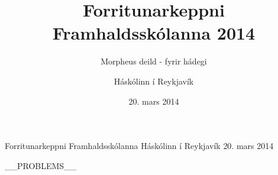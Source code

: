 \documentclass[11pt,a4paper,oneside]{article}
\title{Forritunarkeppni Framhaldsskólanna 2014}
\subtitle{Morpheus deild - fyrir hádegi}
\date{20. mars 2014}
\author{Háskólinn í Reykjavík}
\newcommand{\problemstatement}[1]{  }
\begin{document}

	\maketitle
	\thispagestyle{empty}
	\pagebreak

	\contest
	{Forritunarkeppni Framhaldsskólanna}%
	{Háskólinn í Reykjavík}%
	{20. mars 2014}%

    __PROBLEMS__

\end{document}
